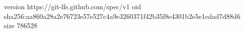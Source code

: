 version https://git-lfs.github.com/spec/v1
oid sha256:aa860a28a2e76723e57e527c4a9e3260371f42b35f8e4301b2e5e1edad7d88d6
size 786528
